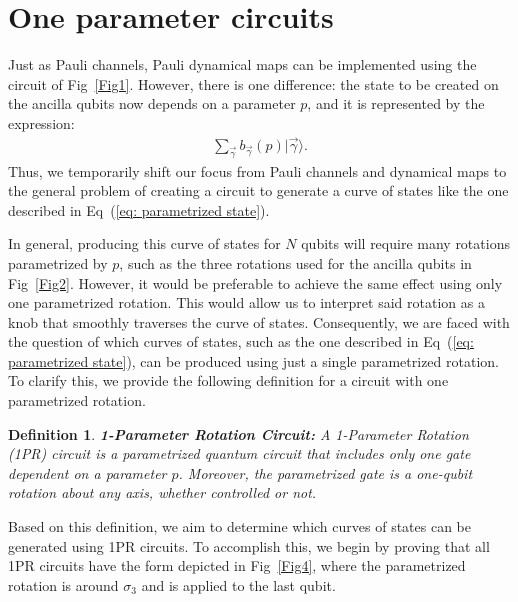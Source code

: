 \documentclass[10pt,letterpaper]{article} %
\newcommand{\fref}[1]{Fig~\ref{#1}}
\newcommand{\eref}[1]{Eq~(\ref{#1})}
\newtheorem{definition}{Definition}
\begin{document}
\section{One parameter circuits} %
\label{sec: 1PR Circuits}


Just as Pauli channels, Pauli dynamical maps can be implemented using the circuit
of \fref{Fig1}. However, there is one difference: 
the state to be created on the ancilla qubits now 
depends on a parameter $p$, and it is represented by the expression:
\begin{eqnarray}
\label{eq: parametrized state}
\sum_{\vec{\gamma}} b_{\vec{\gamma}}(p) |\vec{\gamma}\rangle.
\end{eqnarray}
Thus, we temporarily shift our focus from Pauli
channels and dynamical maps to the general problem of 
creating a circuit to generate a curve of
states like the one described in \eref{eq: parametrized state}.

In general, producing this curve of states for $N$ qubits will require
many rotations parametrized by $p$,
such as the three rotations used for the ancilla
qubits in \fref{Fig2}.
However, it would be preferable to achieve the same effect using only one parametrized rotation.
This would allow us to interpret said rotation 
as a knob that smoothly traverses the curve of states.
Consequently, we are faced with the question of which curves of states, 
such as the one described in \eref{eq: parametrized state}, 
can be produced using just a single parametrized rotation. 
To clarify this, we provide the following definition 
for a circuit with one parametrized rotation.

\begin{definition}{\textbf{1-Parameter Rotation Circuit:}}
A 1-Parameter Rotation (1PR) circuit is a parametrized quantum
circuit that includes only one gate dependent on a parameter $p$.
Moreover, the parametrized gate is a one-qubit rotation about any axis,
whether controlled or not.
\end{definition}

Based on this definition, we aim to determine which curves of 
states can be generated using 1PR circuits. 
To accomplish this, we begin by proving that all 1PR circuits have 
the form depicted in \fref{Fig4},
where the parametrized rotation is around $\sigma_3$ and
is applied to the last qubit.
\end{document}
